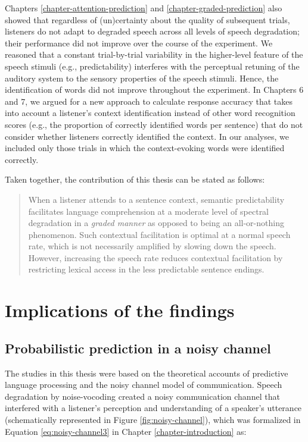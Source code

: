 \documentclass[a4paper, nobind]{templates/ociamthesis}
\begin{document}
Chapters \ref{chapter-attention-prediction} and \ref{chapter-graded-prediction} also showed that regardless of (un)certainty about the quality of subsequent trials,
listeners do not adapt to degraded speech across all levels of speech degradation;
their performance did not improve over the course of the experiment.
We reasoned that a constant trial-by-trial variability in the higher-level feature of the speech stimuli (e.g., predictability)
interferes with the perceptual retuning of the auditory system to the sensory properties of the speech stimuli.
Hence, the identification of words did not improve throughout the experiment.
In Chapters 6 and 7, we argued for a new approach to calculate response accuracy that takes into account a listener's context identification instead of other word recognition scores (e.g., the proportion of correctly identified words per sentence)
that do not consider whether listeners correctly identified the context.
In our analyses, we included only those trials in which the context-evoking words were identified correctly.

Taken together, the contribution of this thesis can be stated as follows:

\begin{quote}
When a listener attends to a sentence context, semantic predictability facilitates language comprehension at a moderate level of spectral degradation in a \emph{graded manner} as opposed to being an all-or-nothing phenomenon.
Such contextual facilitation is optimal at a normal speech rate, which is not necessarily amplified by slowing down the speech.
However, increasing the speech rate reduces contextual facilitation by restricting lexical access in the less predictable sentence endings.
\end{quote}

\hypertarget{implications-of-the-findings}{%
\section{Implications of the findings}\label{implications-of-the-findings}}

\hypertarget{probabilistic-prediction-in-a-noisy-channel}{%
\subsection{Probabilistic prediction in a noisy channel}\label{probabilistic-prediction-in-a-noisy-channel}}

The studies in this thesis were based on the theoretical accounts of predictive language processing and the noisy channel model of communication.
Speech degradation by noise-vocoding created a noisy communication channel that interfered with a listener's perception and understanding of a speaker's utterance
(schematically represented in Figure \ref{fig:noisy-channel}),
which was formalized in Equation \eqref{eq:noisy-channel3} in Chapter \ref{chapter-introduction} as:
\end{document}
